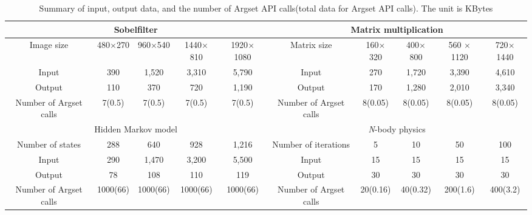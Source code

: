 \documentclass[conference]{IEEEtran}
\begin{document}
\begin{table}
\centering
\caption{Summary of input, output data, and the number of Argset API
calls(total data for Argset API calls). The unit is KBytes}
	\begin{tabular}{c|c|c|c|c|c|c|c|c|c}
	\hline\hline
	 \multicolumn{5}{c|}{Sobelfilter} & \multicolumn{5}{c}{Matrix
multiplication} \\ \hline\hline
	Image size & 480$\times$270 & 960$\times$540 & 1440$\times$810 &
1920$\times$1080 & Matrix size & 160$\times$320 & 400$\times$800 & 560
$\times$1120 & 720$\times$1440 \\
	\hline
	Input & 390 & 1,520 & 3,310 & 5,790 & Input & 270 & 1,720 & 3,390 & 4,610 \\
    \hline
	Output & 110 & 370 & 720 & 1,190 & Output & 170 & 1,280 & 2,010 & 3,340 \\
	\hline
	Number of Argset calls & 7(0.5) & 7(0.5) & 7(0.5) & 7(0.5) & Number
of Argset calls &
8(0.05) & 8(0.05) & 8(0.05) & 8(0.05)
\\
	\hline\hline
	 \multicolumn{5}{c|}{Hidden Markov model} &
\multicolumn{5}{c}{\textit{N}-body physics} \\ \hline\hline
	Number of states & 288 & 640 & 928 & 1,216 & Number of iterations &
5 & 10 & 50 & 100 \\ \hline
	Input & 290 & 1,470 & 3,200 & 5,500 & Input & 15 & 15 & 15 & 15 \\
\hline
	Output & 78 & 108 & 110 & 119 & Output & 30 & 30 & 30 & 30 \\ \hline
	Number of Argset calls & 1000(66) & 1000(66) & 1000(66) & 1000(66) &
Number of Argset
calls & 20(0.16) & 40(0.32) &
200(1.6) & 400(3.2) \\ \hline
	\end{tabular}
\end{table}
%
\end{document}
